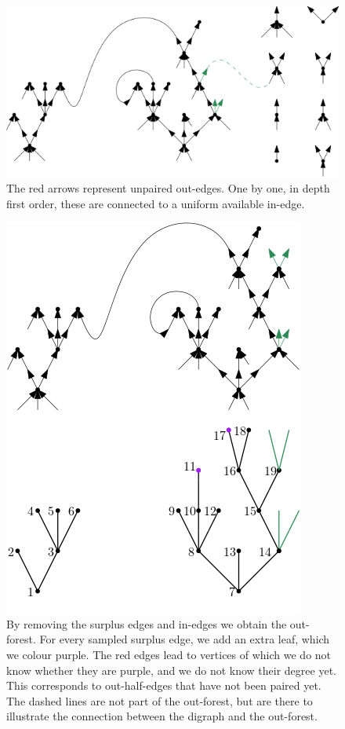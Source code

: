 \begin{figure}
    \centering
    \includegraphics[scale=0.6]{Content/Pictures/Configuration model.png}
    \caption{The red arrows represent unpaired out-edges. One by one, in depth first order, these are connected to a uniform available in-edge.}
    \label{fig.configuration model}
\end{figure}
\begin{figure}
    \centering
    \includegraphics[scale=0.8]{Content/Pictures/Configuration model out-forest.png}
    \caption{By removing the surplus edges and in-edges we obtain the out-forest. For every sampled surplus edge, we add an extra leaf, which we colour purple. The red edges lead to vertices of which we do not know whether they are purple, and we do not know their degree yet. This corresponds to out-half-edges that have not been paired yet. The dashed lines are not part of the out-forest, but are there to illustrate the connection between the digraph and the out-forest.}
    \label{fig.configuration modeloutforest}
\end{figure}
